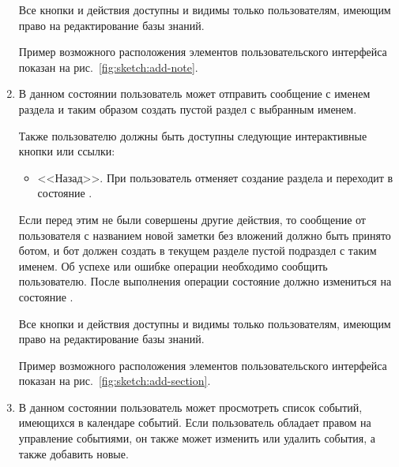 \begin{enumerate}
            Все кнопки и действия доступны и видимы только пользователям, имеющим право на редактирование
            базы знаний.

            Пример возможного расположения элементов пользовательского интерфейса показан на
            рис.~\ref{fig:sketch:add-note}.

        \item \label{itm:req:ui:states:create-section}

            В данном состоянии пользователь может отправить сообщение с именем раздела и таким образом
            создать пустой раздел с выбранным именем.

            Также пользователю должны быть доступны следующие интерактивные кнопки или ссылки:
            \begin{itemize}
                \item
                    <<Назад>>.
                    При  пользователь отменяет создание раздела и
                    переходит в состояние
                    \hyperref[itm:req:ui:states:navx]
                    {}.
            \end{itemize}
            
            Если перед этим не были совершены другие действия, то сообщение от пользователя
            с названием новой заметки без вложений должно быть принято ботом, и
            бот должен создать в текущем разделе пустой подраздел с таким именем.
            Об успехе или ошибке операции необходимо сообщить пользователю.
            После выполнения операции состояние должно измениться на
            состояние \hyperref[itm:req:ui:states:navx]
            {}.

            Все кнопки и действия доступны и видимы только пользователям, имеющим право на редактирование
            базы знаний.

            Пример возможного расположения элементов пользовательского интерфейса показан на
            рис.~\ref{fig:sketch:add-section}.

        \item \label{itm:req:ui:states:calendar}

            В данном состоянии пользователь может просмотреть список событий, имеющихся в календаре событий.
            Если пользователь обладает правом на управление событиями, он также может изменить или удалить
            события, а также добавить новые.


\end{enumerate}
